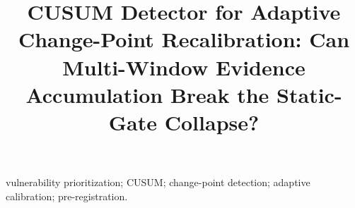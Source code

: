 \documentclass[journal]{IEEEtran}
\title{CUSUM Detector for Adaptive Change-Point Recalibration:
Can Multi-Window Evidence Accumulation Break the Static-Gate Collapse?}
\author{%
  \IEEEauthorblockN{Harshavardhan Malla}
  \IEEEauthorblockA{Independent Researcher}%
}
\begin{document}
\maketitle

\begin{abstract}

\end{abstract}

\begin{IEEEkeywords}
vulnerability prioritization; CUSUM; change-point detection; adaptive
calibration; pre-registration.
\end{IEEEkeywords}















\end{document}
